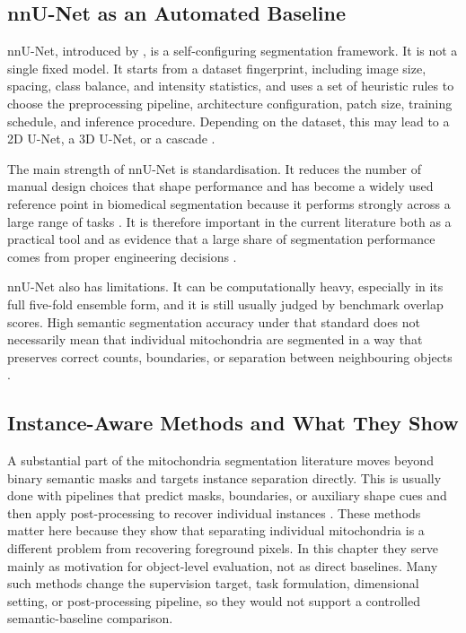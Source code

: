 \documentclass[logo,bsc,singlespacing,parskip,online]{infthesis}
\begin{document}
\subsection{nnU-Net as an Automated Baseline}

nnU-Net, introduced by \citet{isensee2021nnu}, is a
self-configuring segmentation framework. It is not a single fixed model. It
starts from a dataset fingerprint, including image size, spacing, class balance,
and intensity statistics, and uses a set of heuristic rules to choose the
preprocessing pipeline, architecture configuration, patch size, training
schedule, and inference procedure. Depending on the dataset, this may lead to a
2D U-Net, a 3D U-Net, or a cascade \citep{isensee2021nnu,
cicek2016threeDunet}.

The main strength of nnU-Net is standardisation. It reduces the number of manual
design choices that shape performance and has become a widely used
reference point in biomedical segmentation because it performs strongly across a
large range of tasks \citep{isensee2021nnu}. It is therefore important in the
current literature both as a practical tool and as evidence that a large share
of segmentation performance comes from proper engineering decisions
\citep{isensee2021nnu}.

nnU-Net also has limitations. It can be computationally heavy, especially in
its full five-fold ensemble form, and it is still usually judged by benchmark
overlap scores. High semantic segmentation accuracy under that standard does not
necessarily mean that individual mitochondria are segmented in a way that
preserves correct counts, boundaries, or separation between neighbouring
objects \citep{wei2020mitoem, conrad2023instance}.

\subsection{Instance-Aware Methods and What They Show}

A substantial part of the mitochondria segmentation literature moves beyond
binary semantic masks and targets instance separation directly. This is usually
done with pipelines that predict masks, boundaries, or auxiliary shape cues and
then apply post-processing to recover individual instances
\citep{wei2020mitoem, conrad2023instance}. These methods matter here because
they show that separating individual mitochondria is a different problem from
recovering foreground pixels. In this chapter they serve mainly as motivation
for object-level evaluation, not as direct baselines. Many such methods change
the supervision target, task formulation, dimensional setting, or
post-processing pipeline, so they would not support a controlled
semantic-baseline comparison.
\end{document}

